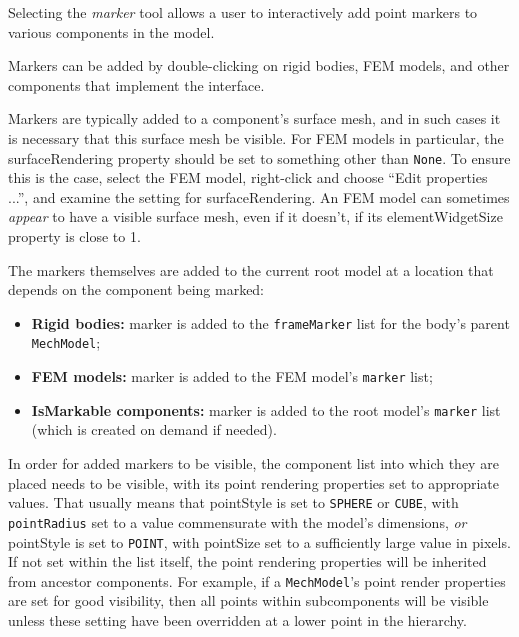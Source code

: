 \documentclass{article}
\begin{document}
Selecting the {\it marker} tool allows a user to interactively add
point markers to various components in the model.

Markers can be added by double-clicking on rigid bodies, FEM models,
and other components that implement the
 interface.

\begin{sideblock}
Markers are typically added to a component's surface mesh, and in such
cases it is necessary that this surface mesh be visible. For FEM
models in particular, the {\sf surfaceRendering} property should be
set to something other than {\tt None}. To ensure this is the case,
select the FEM model, right-click and choose {\sf ``Edit properties
...''}, and examine the setting for {\sf surfaceRendering}. An FEM model
can sometimes {\it appear} to have a visible surface mesh, even if it
doesn't, if its {\sf elementWidgetSize} property is close to 1.
\end{sideblock}

The markers themselves are added to the current root model at a
location that depends on the component being marked:

\begin{itemize}
\item {\bf Rigid bodies:} marker is added to the {\tt frameMarker}
list for the body's parent {\tt MechModel};

\item {\bf FEM models:} marker is added to the FEM model's {\tt marker} list;

\item {\bf IsMarkable components:} marker is added to the root model's
{\tt marker} list (which is created on demand if needed).

\end{itemize}

In order for added markers to be visible, the component list into
which they are placed needs to be visible, with its point rendering
properties set to appropriate values. That usually means that {\sf
pointStyle} is set to {\tt SPHERE} or {\tt CUBE}, with {\tt
pointRadius} set to a value commensurate with the model's dimensions,
{\it or} {\sf pointStyle} is set to {\tt POINT}, with {\sf pointSize}
set to a sufficiently large value in pixels.  If not set within the
list itself, the point rendering properties will be inherited from
ancestor components. For example, if a {\tt MechModel}'s point render
properties are set for good visibility, then all points within
subcomponents will be visible unless these setting have been
overridden at a lower point in the hierarchy.
\end{document}
